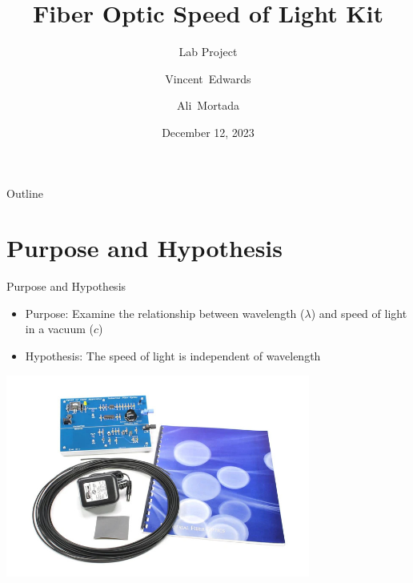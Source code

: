\documentclass{beamer}
\title{Fiber Optic Speed of Light Kit}
\subtitle{Lab Project}
\author{Vincent~Edwards \and Ali~Mortada}
\institute{Mt.~San Antonio College, Physics 4C, CRN 20889}
\date{December 12, 2023}
\begin{document}
\begin{frame}
  \titlepage
\end{frame}

\begin{frame}{Outline}
  \tableofcontents
\end{frame}

\section{Purpose and Hypothesis}
\begin{frame}{Purpose and Hypothesis}
  \begin{itemize}
    \item Purpose: Examine the relationship between wavelength ($\lambda$) and speed of light in a vacuum ($c$)
    \item Hypothesis: The speed of light is independent of wavelength
  \end{itemize}
  \begin{center}
    \includegraphics[width=0.75\textwidth]{speed-of-light-apparatus.jpg}
  \end{center}
\end{frame}

\end{document}
